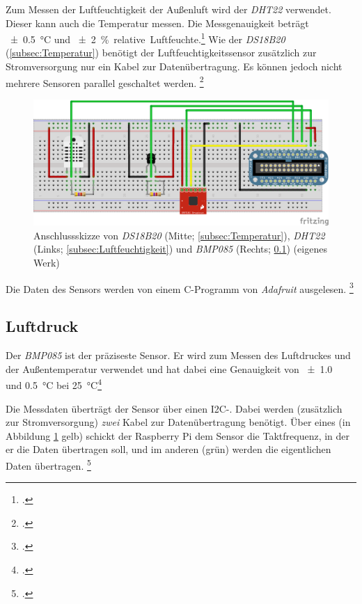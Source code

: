Zum Messen der Luftfeuchtigkeit der Außenluft wird der \emph{DHT22} verwendet. Dieser kann auch die Temperatur messen. Die Messgenauigkeit beträgt \SI{\pm 0.5}{\degreeCelsius} und \SI{\pm 2}{\% .relative.Luftfeuchte}.\footcite{DHT22}
Wie der \emph{DS18B20} (\ref{subsec:Temperatur}) benötigt der Luftfeuchtigkeitssensor zusätzlich zur Stromversorgung nur ein Kabel zur Datenübertragung. Es können jedoch nicht mehrere Sensoren parallel geschaltet werden. \footcite[Wiring]{DHT}

\begin{figure}
  \centering
     \includegraphics[width=\textwidth]{figures/steckbrett.png}
  \caption{Anschlussskizze von \emph{DS18B20} (Mitte; \ref{subsec:Temperatur}), \emph{DHT22} (Links; \ref{subsec:Luftfeuchtigkeit}) und \emph{BMP085} (Rechts; \ref{subsec:Luftdruck}) (eigenes Werk)}
  \label{fig:steckbrett}
\end{figure}

Die Daten des Sensors werden von einem \gls{C}-Programm von \emph{Adafruit} ausgelesen.
\footcite[Software Install]{DHT}

\subsection{Luftdruck}
\label{subsec:Luftdruck}

Der \emph{BMP085} ist der präziseste Sensor. Er wird zum Messen des Luftdruckes und der Außentemperatur verwendet und hat dabei eine Genauigkeit von \SI{\pm 1.0}{\hecto{}} und \SI{0.5}{\degreeCelsius} bei \SI{25}{\degreeCelsius}\footcite[6]{BMP085}

Die Messdaten überträgt der Sensor über einen \gls{I2C}-. Dabei werden (zusätzlich zur Stromversorgung) \emph{zwei} Kabel zur Datenübertragung benötigt.
Über eines (in Abbildung \ref{fig:steckbrett} gelb) schickt der Raspberry Pi dem Sensor die Taktfrequenz, in der er die Daten übertragen soll, und im anderen (grün) werden die eigentlichen Daten übertragen.
\footcite[Hooking Everything Up]{bmp058_adafruit}

